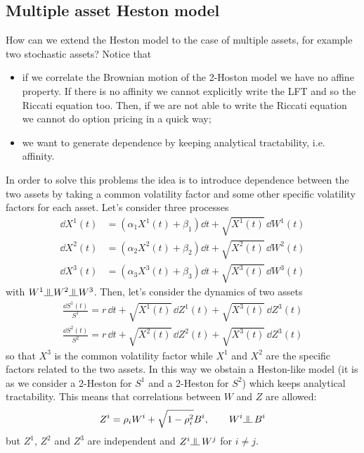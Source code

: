 \subsection{Multiple asset Heston model}
How can we extend the Heston model to the case of multiple assets, for example two stochastic assets? Notice that
\begin{itemize}
    \item if we correlate the Brownian motion of the 2-Hoston model we have no affine property. If there is no affinity we cannot explicitly write the LFT and so the Riccati equation too. Then, if we are not able to write the Riccati equation we cannot do option pricing in a quick way;
    \item we want to generate dependence by keeping analytical tractability, i.e. affinity.
\end{itemize}
In order to solve this problems the idea is to introduce dependence between the two assets by taking a common volatility factor and some other specific volatility factors for each asset. Let's consider three processes
\begin{align*}
    \dd X^1(t) &= (\alpha_1X^1(t) + \beta_1)\dd t + \sqrt{X^1(t)}\,\dd W^1(t) \\
    \dd X^2(t) &= (\alpha_2X^2(t) + \beta_2)\dd t + \sqrt{X^2(t)}\,\dd W^2(t) \\
    \dd X^3(t) &= (\alpha_3X^3(t) + \beta_3)\dd t + \sqrt{X^3(t)}\,\dd W^3(t)
\end{align*}
with $W^1 \indep W^2 \indep W^3$. Then, let's consider the dynamics of two assets
\begin{align*}
    \frac{\dd S^1(t)}{S^1} = r\,\dd t + \sqrt{X^1(t)}\,\dd Z^1(t) + \sqrt{X^3(t)}\,\dd Z^3(t) \\
    \frac{\dd S^2(t)}{S^2} = r\,\dd t + \sqrt{X^2(t)}\,\dd Z^2(t) + \sqrt{X^3(t)}\,\dd Z^3(t)
\end{align*}
so that $X^3$ is the common volatility factor while $X^1$ and $X^2$ are the specific factors related to the two assets. In this way we obstain a Heston-like model (it is as we consider a 2-Heston for $S^1$ and a 2-Heston for $S^2$) which keeps analytical tractability. This means that correlations between $W$ and $Z$ are allowed:
\begin{equation*}
    Z^i = \rho_i W^i + \sqrt{1-\rho_i^2} B^i, \qquad W^i \indep\, B^i
\end{equation*}
but $Z^1$, $Z^2$ and $Z^3$ are independent and $Z^i \indep\, W^j$ for $i\ne j$. \\
